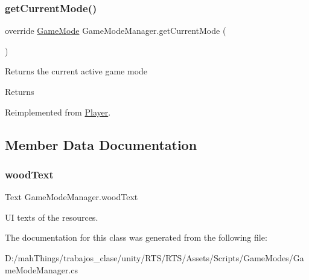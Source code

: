 \subsubsection{\texorpdfstring{get\+Current\+Mode()}{getCurrentMode()}}
{\footnotesize\ttfamily override \mbox{\hyperlink{class_game_mode}{Game\+Mode}} Game\+Mode\+Manager.\+get\+Current\+Mode (\begin{DoxyParamCaption}{ }\end{DoxyParamCaption})\hspace{0.3cm}{\ttfamily [virtual]}}



Returns the current active game mode 

\begin{DoxyReturn}{Returns}

\end{DoxyReturn}


Reimplemented from \mbox{\hyperlink{class_player_aaa2486d0dcaa57a4eb757b1e9d02d73f}{Player}}.



\subsection{Member Data Documentation}
\mbox{\label{class_game_mode_manager_a29e2b01816f5a4b0dc03ebf086f04c30}} 
\subsubsection{\texorpdfstring{wood\+Text}{woodText}}
{\footnotesize\ttfamily Text Game\+Mode\+Manager.\+wood\+Text}



UI texts of the resources. 



The documentation for this class was generated from the following file\+:\begin{DoxyCompactItemize}
\item 
D\+:/mah\+Things/trabajos\+\_\+clase/unity/\+R\+T\+S/\+R\+T\+S/\+Assets/\+Scripts/\+Game\+Modes/Game\+Mode\+Manager.\+cs\end{DoxyCompactItemize}
